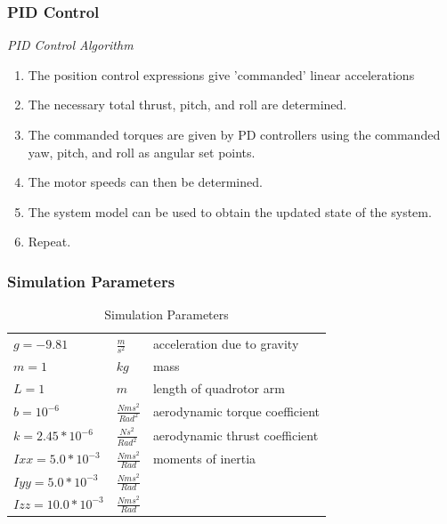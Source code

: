 \documentclass{beamer}
\begin{document}
\begin{frame}
\frametitle{PID Control}

\textit{PID Control Algorithm}

\begin{enumerate}
\item The position control expressions give 'commanded' linear accelerations
\item The necessary total thrust, pitch, and roll are determined.
\item The commanded torques are given by PD controllers using the commanded yaw, pitch, and roll as angular set points.
\item The motor speeds can then be determined.
\item The system model can be used to obtain the updated state of the system.
\item Repeat.
\end{enumerate}

\end{frame}




\begin{frame}
\frametitle{Simulation Parameters}

\begin{table}
\centering
\begin{tabular}{l l l}
    \hline
    $g = -9.81            $& $ \frac{m}{s^2}          $ & acceleration due to gravity\\
    $m = 1                $& $ kg                      $ & mass\\ 
    $L = 1                $& $ m                       $ & length of quadrotor arm\\
    $b = 10^{-6}          $& $ \frac{N m s^2}{Rad^2}  $ & aerodynamic torque coefficient\\
    $k = 2.45*10^{-6}     $& $ \frac{N s^2}{Rad^2}    $ & aerodynamic thrust coefficient\\
    $Ixx = 5.0*10^{-3}    $& $ \frac{N m s^2}{Rad}    $ & moments of inertia \\
    $Iyy = 5.0*10^{-3}    $& $ \frac{N m s^2}{Rad}    $ & \\
    $Izz = 10.0*10^{-3}   $& $ \frac{N m s^2}{Rad}    $ & \\
    \hline
\end{tabular}
\caption[Simulation Parameters]{Simulation Parameters}
\end{table}

\end{frame}
\end{document}
